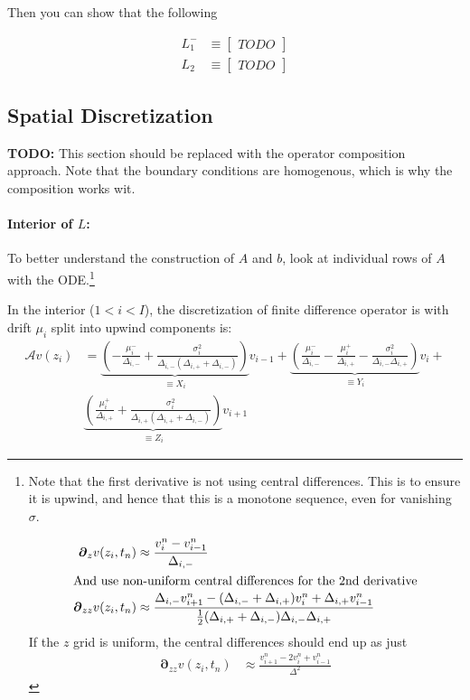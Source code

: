 \documentclass[11pt]{article}
\newcommand{\D}[1][]{\ensuremath{\boldsymbol{\partial}_{#1}}}
\begin{document}
Then you can show that the following

\begin{align}
L_1^{-} &\equiv \begin{bmatrix} TODO \end{bmatrix}\\
L_2 &\equiv \begin{bmatrix}  TODO \end{bmatrix}
\end{align}

\subsection{Spatial Discretization}\label{sec:spatial-discretization}


\textbf{TODO:} This section should be replaced with the operator composition approach.  Note that the boundary conditions are homogenous, which is why the composition works wit.

\paragraph{Interior of $L$:}
To better understand the construction of $A$ and $b$, look at individual rows of $A$ with the ODE.\footnote{Note that the first derivative is not using central differences.  This is to ensure it is upwind, and hence that this is a monotone sequence, even for vanishing $\sigma$.

	\begin{align}
	\D[z]v(z_i, t_n) &\approx \frac{v_i^n - v_{i-1}^n}{\Delta_{i,-}}\label{eq:D-v-z}\\
	\intertext{And use non-uniform central differences for the 2nd derivative}
	\D[zz]v(z_i, t_n) &\approx \frac{\Delta_{i,-}v^n_{i+1} - (\Delta_{i,-}+\Delta_{i,+})v^n_i+\Delta_{i,+}v^n_{i-1}}{\frac1{2}(\Delta_{i,+}+\Delta_{i,-})\Delta_{i,-}\Delta_{i,+}}\label{eq:D-v-zz}
	\end{align}
	If the $z$ grid is uniform, the central differences should end up as just
	\begin{align}
	\D[zz]v(z_i, t_n) &\approx \frac{v_{i+1}^n - 2 v_i^n + v_{i-1}^n}{\Delta^2}\label{eq:D-v-zz-uniform}
	\end{align}
}

In the interior ($1 < i < I$), the discretization of finite difference operator is with drift $\mu_i$ split into upwind components is:
\begin{align}
\mathcal{A} v(z_i)
&= \underbrace{\left(-\frac{\mu_i^{-}}{\Delta_{i,-}} +\frac{\sigma_i^2}{\Delta_{i,-}(\Delta_{i,+}+\Delta_{i,-})}\right)}_{\equiv X_i}v_{i-1} + \underbrace{\left(\frac{\mu_i^{-}}{\Delta_{i,-}} - \frac{\mu_i^{+}}{\Delta_{i,+}}-\frac{\sigma_i^2}{\Delta_{i,-}\Delta_{i,+}}\right)}_{\equiv Y_i}v_i +\nonumber\\ &\underbrace{\left(\frac{\mu_i^{+}}{\Delta_{i,+}} + \frac{\sigma_i^2}{\Delta_{i,+}(\Delta_{i,+}+\Delta_{i,-})}\right)}_{\equiv Z_i}v_{i+1}\label{eq:A-collected-interior-with-nonuniform-grid}
\end{align}
\end{document}
